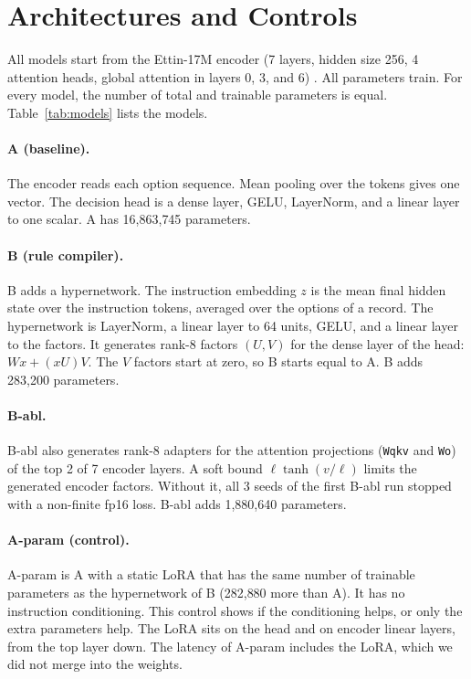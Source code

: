 \documentclass[11pt,a4paper]{article}
\begin{document}
\section{Architectures and Controls}\label{sec:models}

All models start from the Ettin-17M encoder (7 layers, hidden size 256, 4 attention heads, global attention in layers 0, 3, and 6) \cite{weller2026}.
All parameters train.
For every model, the number of total and trainable parameters is equal.
Table~\ref{tab:models} lists the models.

\paragraph{A (baseline).}
The encoder reads each option sequence.
Mean pooling over the tokens gives one vector.
The decision head is a dense layer, GELU, LayerNorm, and a linear layer to one scalar.
A has 16{,}863{,}745 parameters.

\paragraph{B (rule compiler).}
B adds a hypernetwork.
The instruction embedding $z$ is the mean final hidden state over the instruction tokens, averaged over the options of a record.
The hypernetwork is LayerNorm, a linear layer to 64 units, GELU, and a linear layer to the factors.
It generates rank-8 factors $(U, V)$ for the dense layer of the head: $Wx + (xU)V$.
The $V$ factors start at zero, so B starts equal to A.
B adds 283{,}200 parameters.

\paragraph{B-abl.}
B-abl also generates rank-8 adapters for the attention projections (\texttt{Wqkv} and \texttt{Wo}) of the top 2 of 7 encoder layers.
A soft bound $\ell \tanh(v/\ell)$ limits the generated encoder factors.
Without it, all 3 seeds of the first B-abl run stopped with a non-finite fp16 loss.
B-abl adds 1{,}880{,}640 parameters.

\paragraph{A-param (control).}
A-param is A with a static LoRA \cite{hu2021} that has the same number of trainable parameters as the hypernetwork of B (282{,}880 more than A).
It has no instruction conditioning.
This control shows if the conditioning helps, or only the extra parameters help.
The LoRA sits on the head and on encoder linear layers, from the top layer down.
The latency of A-param includes the LoRA, which we did not merge into the weights.
\end{document}

